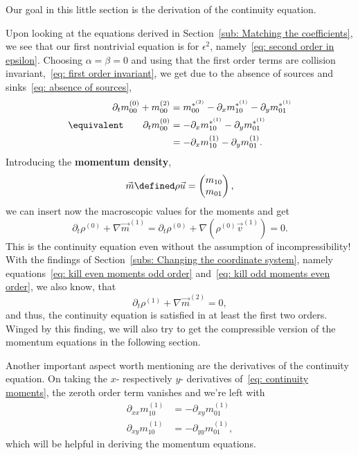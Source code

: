 Our goal in this little section is the derivation of the continuity equation.

Upon looking at the equations derived in Section~\ref{sub: Matching the coefficients}, we see that our first nontrivial equation is for $\epsilon^2$, namely~\eqref{eq: second order in epsilon}.
Choosing $\alpha=\beta=0$ and using that the first order terms are collision invariant,~\eqref{eq: first order invariant}, we get due to the absence of sources and sinks~\eqref{eq: absence of sources},
\begin{align}
  \nonumber
  \partial_t m_{00}^{(0)} + m_{00}^{(2)} & =  m_{00}^{*^{(2)}} - \partial_x m_{10}^{*^{(1)}} - \partial_y m_{01}^{*^{(1)}} \\
  \equivalent \qquad \partial_t m_{00}^{(0)} & =  - \partial_x m_{10}^{*^{(1)}} - \partial_y m_{01}^{*^{(1)}} \nonumber
  \\
  & =  - \partial_x m_{10}^{(1)} - \partial_y m_{01}^{(1)}.
  \label{eq: continuity moments}
\end{align}
Introducing the \textbf{momentum density},
\begin{equation}
  \vec{m} \defined \rho \vec{u} = \begin{pmatrix}m_{10} \\m_{01}  \end{pmatrix},
\end{equation}
we can insert now the macroscopic values for the moments and get
\begin{equation}
  \partial_t \rho^{(0)} + \nabla \vec{m}^{(1)} =
  \partial_t \rho^{(0)} + \nabla (\rho^{(0)} \vec{v}^{(1)}) = 0.
\end{equation}
This is the continuity equation even without the assumption of incompressibility!
With the findings of Section~\ref{subs: Changing the coordinate system},
namely equations~\eqref{eq: kill even moments odd order} and~\eqref{eq: kill odd moments even order}, we also know, that
\begin{equation}
  \partial_t \rho^{(1)} + \nabla \vec{m}^{(2)} = 0,
\end{equation}
and thus, the continuity equation is satisfied in at least the first two orders.
Winged by this finding, we will also try to get the compressible version of the momentum equations in the following section.

Another important aspect worth mentioning are the derivatives of the continuity equation.
On taking the $x$- respectively $y$- derivatives of~\eqref{eq: continuity moments}, the zeroth order term vanishes and we're left with
\begin{align}
  \label{eq: continuity derivative x}
  \partial_{xx} m_{10}^{(1)} & = - \partial_{xy} m_{01}^{(1)}\\
  \label{eq: continuity derivative y}
  \partial_{xy} m_{10}^{(1)} & = - \partial_{yy} m_{01}^{(1)},
\end{align}
which will be helpful in deriving the momentum equations.
